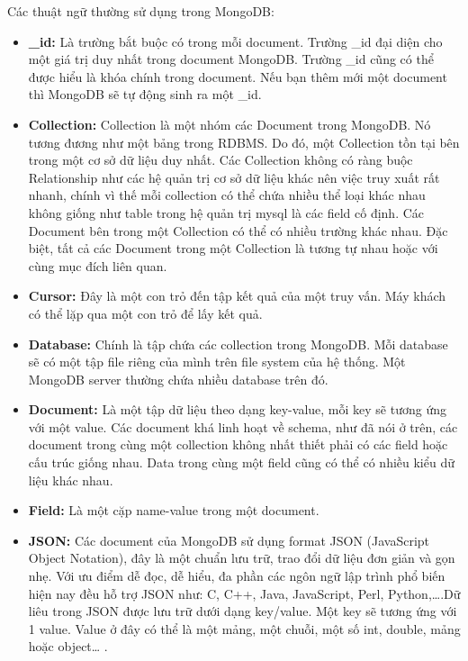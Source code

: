 Các thuật ngữ thường sử dụng trong MongoDB:
\begin{itemize}
    \item \textbf{\_id:} Là trường bắt buộc có trong mỗi document. Trường \_id đại diện cho một giá trị duy nhất trong document MongoDB. Trường \_id cũng có thể được hiểu là khóa chính trong document. Nếu bạn thêm mới một document thì MongoDB sẽ tự động sinh ra một \_id.
    \item \textbf{Collection:} Collection là một nhóm các Document trong MongoDB. Nó tương đương như một bảng trong RDBMS. Do đó, một Collection tồn tại bên trong một cơ sở dữ liệu duy nhất. Các Collection không có ràng buộc Relationship như các hệ quản trị cơ sở dữ liệu khác nên việc truy xuất rất nhanh, chính vì thế mỗi collection có thể chứa nhiều thể loại khác nhau không giống như table trong hệ quản trị mysql là các field cố định. Các Document bên trong một Collection có thể có nhiều trường khác nhau. Đặc biệt, tất cả các Document trong một Collection là tương tự nhau hoặc với cùng mục đích liên quan.
    \item \textbf{Cursor:} Đây là một con trỏ đến tập kết quả của một truy vấn. Máy khách có thể lặp qua một con trỏ để lấy kết quả.
    \item \textbf{Database:} Chính là tập chứa các collection trong MongoDB. Mỗi database sẽ có một tập file riêng của mình trên file system của hệ thống. Một MongoDB server thường chứa nhiều database trên đó.
    \item \textbf{Document:} Là một tập dữ liệu theo dạng key-value, mỗi key sẽ tương ứng với một value. Các document khá linh hoạt về schema, như đã nói ở trên, các document trong cùng một collection không nhất thiết phải có các field hoặc cấu trúc giống nhau. Data trong cùng một field cũng có thể có nhiều kiểu dữ liệu khác nhau.
    \item \textbf{Field:} Là một cặp name-value trong một document.
    \item \textbf{JSON:} Các document của MongoDB sử dụng format JSON (JavaScript Object Notation), đây là một chuẩn lưu trữ, trao đổi dữ liệu đơn giản và gọn nhẹ. Với ưu điểm dễ đọc, dễ hiểu, đa phần các ngôn ngữ lập trình phổ biến hiện nay đều hỗ trợ JSON như: C, C++, Java, JavaScript, Perl, Python,….Dữ liêu trong JSON được lưu trữ dưới dạng key/value. Một key sẽ tương ứng với 1 value. Value ở đây có thể là một mảng, một chuỗi, một số int, double, mảng hoặc object… .
    
    
\end{itemize}

